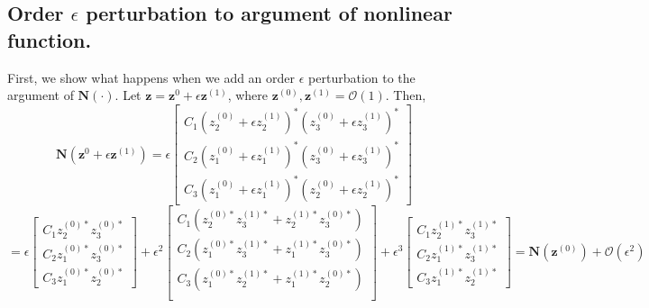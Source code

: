 \documentclass{article}
\newcommand{\eps}{\epsilon}
\newcommand{\bb}[1]{\mathbf{#1}}
\theoremstyle{definition}
\begin{document}
\subsection{Order $\eps$ perturbation to argument of nonlinear function.}
First, we show what happens when we add an order $\epsilon$ perturbation to the argument of $\bb{N}(\cdot)$. 
Let $\bb{z} = \bb{z}^{0} + \eps \bb{z}^{(1)}$, where $\bb{z}^{(0)}, \bb{z}^{(1)} = \mathcal{O}(1)$.
Then, \[
\bb{N}(\bb{z}^{0} + \eps \bb{z}^{(1)}) = \eps \begin{bmatrix}
C_1 (z_2^{(0)} + \eps z_2^{(1)})^*(z_3^{(0)}+ \eps z_3^{(1)})^*\\
C_2 (z_1^{(0)} + \eps z_1^{(1)})^*(z_3^{(0)}+ \eps z_3^{(1)})^*\\
C_3 (z_1^{(0)} + \eps z_1^{(1)})^*(z_2^{(0)}+ \eps z_2^{(1)})^*
\end{bmatrix} \]
\[
=\eps \begin{bmatrix}
C_1 z_2^{(0)*}z_3^{(0)*}\\
C_2 z_1^{(0)*}z_3^{(0)*}\\
C_3 z_1^{(0)*}z_2^{(0)*}
\end{bmatrix} + \eps^2 \begin{bmatrix}
C_1 \left(z_2^{(0)*}z_3^{(1)*} + z_2^{(1)*}z_3^{(0)*}\right)\\
C_2 \left(z_1^{(0)*}z_3^{(1)*} + z_1^{(1)*}z_3^{(0)*}\right)\\
C_3 \left(z_1^{(0)*}z_2^{(1)*} + z_1^{(1)*}z_2^{(0)*}\right)\\
\end{bmatrix} + \eps^3 \begin{bmatrix}
C_1 z_2^{(1)*}z_3^{(1)*}\\
C_2 z_1^{(1)*}z_3^{(1)*}\\
C_3 z_1^{(1)*}z_2^{(1)*}
\end{bmatrix}
= \bb{N}(\bb{z}^{(0)}) +\mathcal{O}(\eps^2)\]
\end{document}
